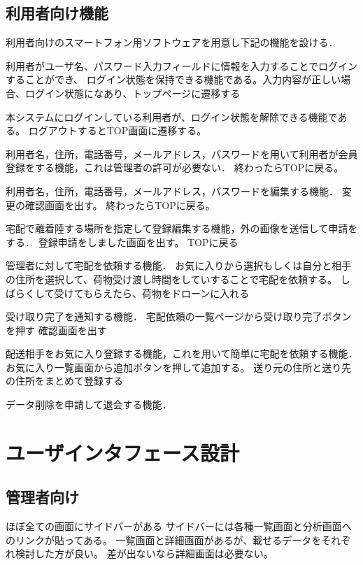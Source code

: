 \documentclass[a4paper, titlepage]{jsarticle}
\begin{document}
\subsection{利用者向け機能}
利用者向けのスマートフォン用ソフトウェアを用意し下記の機能を設ける．
\begin{description}[labelwidth=\linewidth]
  \setlength{\leftskip}{1em}
  \item [ログイン機能] 利用者がユーザ名、パスワード入力フィールドに情報を入力することでログインすることができ、
  ログイン状態を保持できる機能である。入力内容が正しい場合、ログイン状態になあり、トップページに遷移する
  \item [ログアウト機能] 本システムにログインしている利用者が、ログイン状態を解除できる機能である。
  ログアウトするとTOP画面に遷移する。
  \item [利用者会員登録機能] 利用者名，住所，電話番号，メールアドレス，パスワードを用いて利用者が会員登録をする機能，これは管理者の許可が必要ない．
  終わったらTOPに戻る。
  \item [利用者会員情報編集機能] 利用者名，住所，電話番号，メールアドレス，パスワードを編集する機能．
  変更の確認画面を出す。
  終わったらTOPに戻る。
  \item [宅配場所登録機能] 宅配で離着陸する場所を指定して登録編集する機能，外の画像を送信して申請をする．
  登録申請をしました画面を出す。
  TOPに戻る
  \item [宅配依頼機能] 管理者に対して宅配を依頼する機能．
  お気に入りから選択もしくは自分と相手の住所を選択して、荷物受け渡し時間をしていすることで宅配を依頼する。
  しばらくして受けてもらえたら、荷物をドローンに入れる
  \item [受け取り完了通知機能] 受け取り完了を通知する機能．
  宅配依頼の一覧ページから受け取り完了ボタンを押す
  確認画面を出す
  \item [お気に入り登録機能] 配送相手をお気に入り登録する機能，これを用いて簡単に宅配を依頼する機能．
  お気に入り一覧画面から追加ボタンを押して追加する。
  送り元の住所と送り先の住所をまとめて登録する
  \item [退会機能] データ削除を申請して退会する機能．
\end{description}

\section{ユーザインタフェース設計}
\subsection{管理者向け}
ほぼ全ての画面にサイドバーがある
サイドバーには各種一覧画面と分析画面へのリンクが貼ってある。
一覧画面と詳細画面があるが、載せるデータをそれぞれ検討した方が良い。
差が出ないなら詳細画面は必要ない。
\end{document}
